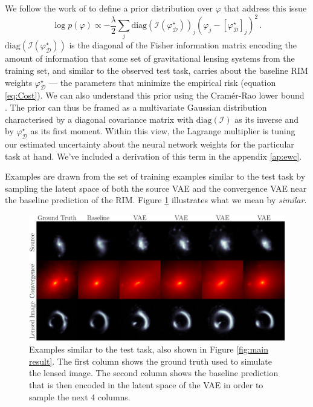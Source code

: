 We follow the work of \citet{Kirkpatrick2016} to define a prior distribution
over $\varphi$ that address this issue
\begin{equation}\label{eq:Prior} 
        \log p(\varphi) \propto -\frac{\lambda}{2}\sum_{j} \mathrm{diag}(\mathcal{I}(\varphi_{\mathcal{D}}^{\star}))_{j} 
        (\varphi_j - [\varphi^{\star}_{\mathcal{D}}]_{j})^{2}\, .
\end{equation} 
$\mathrm{diag}(\mathcal{I}(\varphi_{\mathcal{D}}^{\star}))$ is the diagonal of the 
Fisher information matrix 
encoding the amount of information that  
some set of gravitational lensing systems from 
the training set, and similar to the observed 
test task, carries about the baseline RIM weights $\varphi_{\mathcal{D}}^{\star}$ 
--- the parameters that minimize the empirical risk (equation \ref{eq:Cost}).
We can also understand this prior using the
Cramér-Rao lower bound 
\citep{Rao1945,Cramer1946}.
The prior can thus be framed as a multivariate 
Gaussian distribution characterised by a diagonal covariance matrix with $\mathrm{diag}(\mathcal{I})$ as its inverse 
and by $\varphi^{\star}_{\mathcal{D}}$ as its first moment.
Within this view, the  
Lagrange multiplier is 
tuning our estimated uncertainty about the neural network weights 
for the particular task at hand.  
We've included a derivation 
of this term in the appendix \ref{ap:ewc}.

Examples are drawn from the set of training examples similar to the test task 
by sampling the latent space of both the source 
VAE and the convergence VAE near the baseline prediction of the RIM. Figure \ref{fig:vae fine-tuning} illustrates what we mean by \textit{similar}. 

\begin{figure}[t!]
        \centering
        \includegraphics[width=0.8\linewidth]{figures/vae_samples_similar_to_highlight}
        \caption{Examples similar to the test task, also shown in Figure \ref{fig:main result}. The first column shows the ground truth used to simulate the lensed image. The second column shows the baseline prediction that is then encoded in the latent space of the VAE in order to sample the next 4 columns.
}
        \label{fig:vae fine-tuning}
\end{figure}

